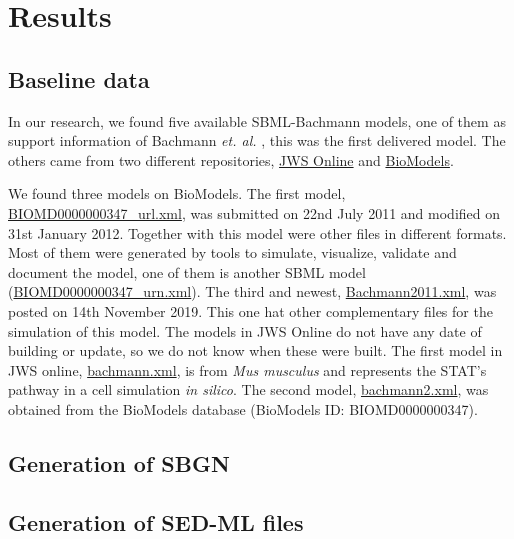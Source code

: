 \section*{Results} \label{sec:resuslt}
\subsection*{Baseline data}
In our research, we found five available SBML-Bachmann models, one of them as support information of Bachmann \textit{et. al.} \cite{bachmannmodel}, this was the first delivered model. The others came from two different repositories, \hyperlink{https://www.systemsmedicine.net/posts/jws-online-biological-systems-modelling}{JWS Online} and \hyperlink{https://www.ebi.ac.uk/biomodels/}{BioModels}.

We found three models on BioModels. The first model, \hyperlink{https://www.ebi.ac.uk/biomodels/model/download/BIOMD0000000347.2?filename=BIOMD0000000347_url.xml}{\textsf{BIOMD0000000347\_url.xml}}, was submitted on 22nd July 2011 and modified on 31st January 2012. Together with this model were other files in different formats. Most of them were generated by tools to simulate, visualize, validate and document the model, one of them is another SBML model (\hyperlink{https://www.ebi.ac.uk/biomodels/model/download/BIOMD0000000347.2?filename=BIOMD0000000347_url.xml}{\textsf{BIOMD0000000347\_urn.xml}}). The third and newest, \hyperlink{https://www.ebi.ac.uk/biomodels/model/download/BIOMD0000000861.2?filename=Bachmann2011.xml}{\textsf{Bachmann2011.xml}}, was posted on 14th November 2019. This one hat other complementary files for the simulation of this model. The models in JWS Online do not have any date of building or update, so we do not know when these were built. The first model in JWS online, \hyperlink{https://jjj.bio.vu.nl/models/bachmann/sbml/?download=1}{\textsf{bachmann.xml}}, is from \textit{Mus musculus} and represents the STAT's pathway in a cell simulation \textit{in silico}. The second model, \hyperlink{https://jjj.bio.vu.nl/models/bachmann2/sbml/?download=1}{\textsf{bachmann2.xml}}, was obtained from the BioModels database (BioModels ID: BIOMD0000000347).

\subsection*{Generation of SBGN}

\subsection*{Generation of SED-ML files}

